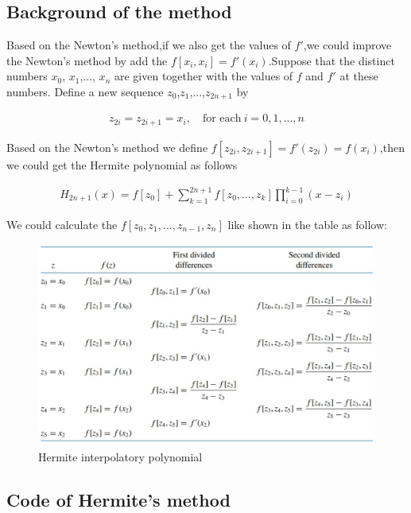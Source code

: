 \documentclass{article}
\begin{document}
\subsection{Background of the method}
Based on the Newton's method,if we also get the values of $f'$,we could improve the Newton's method by add the $ f [x_i, x_i] = f'(x_i)$.Suppose that the distinct numbers $x_0$, $x_1$,..., $x_n$ are given together with the values of
$f$ and $f'$ at these numbers. Define a new sequence $z_0$,$z_1$,...,$z_{2n+1}$ by

\begin{align}
z_{2i} = z_{2i+1} = x_i,\quad \mbox{for each} \ i = 0, 1, ... , n\nonumber
\end{align}

Based on the Newton's method we define $f[z_{2i},z_{2i+1}] = f'(z_{2i}) = f (x_i) $,then we could get the Hermite polynomial as follows

\begin{align}
H_{2n+1}(x) = f [z_0] + \sum_{k=1}^{2n+1}f[z_0,...,z_k ]\prod_{i=0}^{k-1}(x - z_i)
\label{hermite1}
\end{align}


We could calculate the $f [z_0, z_1,..., z_{n-1}, z_{n}]$ like shown in the table as follow:

\begin{figure}[h!]
\centering
\includegraphics[width=1\textwidth]{hermite1.JPG}
\caption{Hermite interpolatory polynomial}
\label{hermite1}
\end{figure}

\subsection{Code of Hermite's method}
\end{document}
